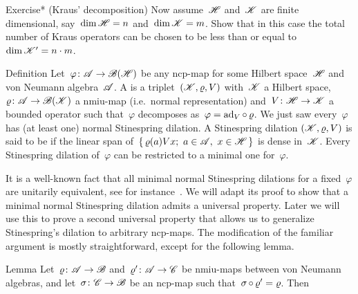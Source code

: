 \begin{parsec}
\begin{point}{Exercise* (Kraus' decomposition)}
Now assume~$\mathscr{H}$ and~$\mathscr{K}$ are finite dimensional,
    say~$\dim \mathscr{H} = n$ and~$\dim \mathscr{K} = m$.
Show that in this case
    the total number of Kraus operators can be chosen
    to be less than or equal to~$\dim \mathscr{K}' = n \cdot m$.
\end{point}
\end{parsec}

\begin{parsec}%
\begin{point}{Definition}%
Let~$\varphi\colon \mathscr{A} \to \mathscr{B}(\mathscr{H})$
    be any ncp-map
    for some Hilbert space~$\mathscr{H}$ and von Neumann algebra~$\mathscr{A}$.
    A 
    is a triplet~$(\mathscr{K},\varrho, V)$
    with~$\mathscr{K}$ a Hilbert space,
    $\varrho\colon \mathscr{A} \to \mathscr{B}(\mathscr{K})$ a nmiu-map
        (i.e.~normal representation)
        and~$V\colon \mathscr{H} \to \mathscr{K}$ a bounded operator
        such that~$\varphi$ decomposes as~$\varphi = \mathrm{ad}_V \mathop{\circ} \varrho$.
    We just saw every~$\varphi$ has (at least one)
        normal Stinespring dilation.
A Stinespring dilation
$(\mathscr{K},\varrho,V)$ is said to be 
if the linear span of~$\{ \,\varrho(a) Vx; \ a \in \mathscr{A},\ x\in \mathscr{H}\,\}$
is dense in~$\mathscr{K}$.
Every Stinespring dilation of~$\varphi$ can be restricted to a minimal one
    for~$\varphi$.
\end{point}
\begin{point}%
It is a well-known fact that all minimal normal Stinespring dilations
    for a fixed~$\varphi$ are unitarily equivalent,
    see for instance~\cite[Proposition 4.2]{paulsen}.
We will adapt its proof to show that a minimal normal Stinespring
    dilation admits a universal property.
Later we will use this to prove a second universal property 
    that allows us to generalize Stinespring's dilation to
    arbitrary ncp-maps.
The modification of the familiar argument
    is mostly straightforward, except for the following lemma.
\end{point}
\begin{point}{Lemma}%
Let~$\varrho\colon \mathscr{A} \to \mathscr{B}$ and~$\varrho'\colon \mathscr{A} \to \mathscr{C}$
    be nmiu-maps between von Neumann algebras,
        and let~$\sigma \colon \mathscr{C} \to \mathscr{B}$ be an ncp-map
        such that~$\sigma \mathop{\circ} \varrho' = \varrho$. Then
\begin{equation*}

\end{equation*}
\end{point}
\end{parsec}
